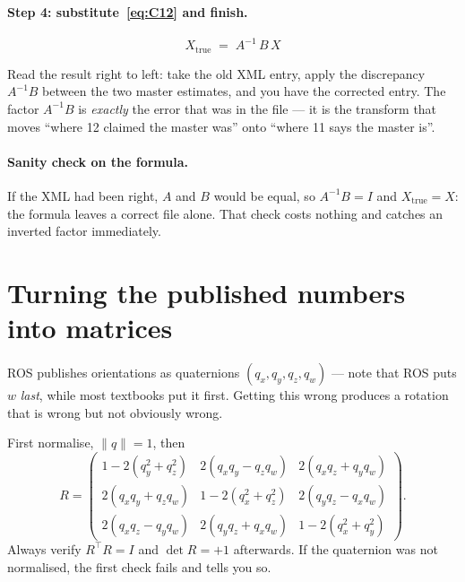 \documentclass[11pt,a4paper]{article}
\begin{document}
\paragraph{Step 4: substitute~\eqref{eq:C12} and finish.}
\begin{equation}
  \boxed{\;X_{\text{true}} \;=\; A^{-1}\,B\,X\;}
  \label{eq:result}
\end{equation}

Read the result right to left: take the old XML entry, apply the discrepancy $A^{-1}B$
between the two master estimates, and you have the corrected entry. The factor $A^{-1}B$
is \emph{exactly} the error that was in the file --- it is the transform that moves
``where 12 claimed the master was'' onto ``where 11 says the master is''.

\paragraph{Sanity check on the formula.} If the XML had been right, $A$ and $B$ would be
equal, so $A^{-1}B = I$ and $X_{\text{true}} = X$: the formula leaves a correct file
alone. That check costs nothing and catches an inverted factor immediately.

\section{Turning the published numbers into matrices}

ROS publishes orientations as quaternions $(q_x, q_y, q_z, q_w)$ --- note that ROS puts
$w$ \emph{last}, while most textbooks put it first. Getting this wrong produces a
rotation that is wrong but not obviously wrong.

First normalise, $\lVert q \rVert = 1$, then
\begin{equation}
  R =
  \begin{pmatrix}
    1 - 2(q_y^2 + q_z^2) & 2(q_x q_y - q_z q_w) & 2(q_x q_z + q_y q_w) \\
    2(q_x q_y + q_z q_w) & 1 - 2(q_x^2 + q_z^2) & 2(q_y q_z - q_x q_w) \\
    2(q_x q_z - q_y q_w) & 2(q_y q_z + q_x q_w) & 1 - 2(q_x^2 + q_y^2)
  \end{pmatrix}.
  \label{eq:q2R}
\end{equation}
Always verify $R^{\!\top}R = I$ and $\det R = +1$ afterwards. If the quaternion was not
normalised, the first check fails and tells you so.
\end{document}
